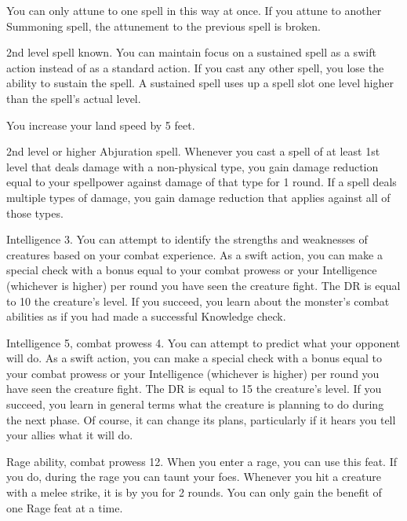 You can only attune to one spell in this way at once.
If you attune to another Summoning spell, the attunement to the previous spell is broken.

\featpre 2nd level spell known.
\featben You can maintain focus on a sustained spell as a swift action instead of as a standard action.
If you cast any other spell, you lose the ability to sustain the spell.
A sustained spell uses up a spell slot one level higher than the spell's actual level.

\featben You increase your land speed by 5 feet.

\featpre 2nd level or higher Abjuration spell.
\featben Whenever you cast a spell of at least 1st level that deals damage with a non-physical type, you gain damage reduction equal to your spellpower against damage of that type for 1 round.
If a spell deals multiple types of damage, you gain damage reduction that applies against all of those types.

\featpre Intelligence 3.
\featben You can attempt to identify the strengths and weaknesses of creatures based on your combat experience.
As a swift action, you can make a special check with a bonus equal to your combat prowess or your Intelligence (whichever is higher)  per round you have seen the creature fight.
The DR is equal to 10 \add the creature's level.
If you succeed, you learn about the monster's combat abilities as if you had made a successful Knowledge check.

\featpres Intelligence 5, combat prowess 4.
\featben You can attempt to predict what your opponent will do.
As a swift action, you can make a special check with a bonus equal to your combat prowess or your Intelligence (whichever is higher)  per round you have seen the creature fight.
The DR is equal to 15 \add the creature's level.
If you succeed, you learn in general terms what the creature is planning to do during the next phase.
Of course, it can change its plans, particularly if it hears you tell your allies what it will do.

\featpres Rage ability, combat prowess 12.
\featben When you enter a rage, you can use this feat. If you do, during the rage you can taunt your foes.
Whenever you hit a creature with a melee strike, it is \taunted by you for 2 rounds.
 You can only gain the benefit of one Rage feat at a time.

